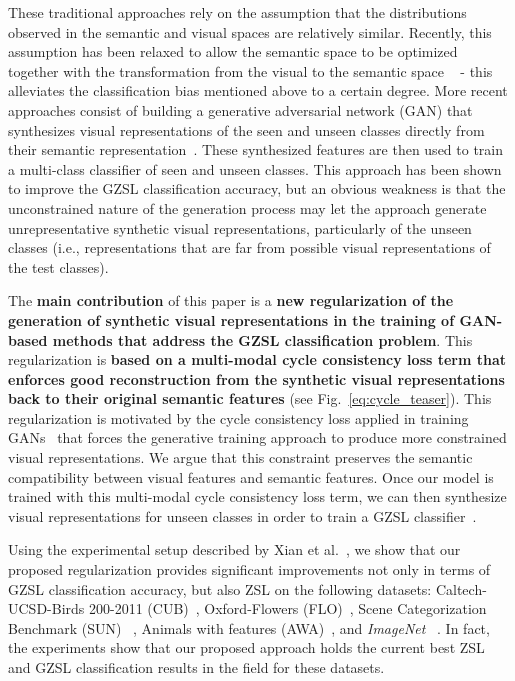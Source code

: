 \documentclass[runningheads]{llncs}
\begin{document}
These traditional approaches rely on the assumption that the distributions observed in the semantic and visual spaces are relatively similar.  Recently, this assumption has been relaxed to allow the semantic space to be optimized together with the transformation from the visual to the semantic space ~\cite{long2017zero} - this alleviates the classification bias mentioned above to a certain degree.  More recent approaches consist of building a generative adversarial network (GAN) that synthesizes visual representations of the seen and unseen classes directly from their semantic representation~\cite{bucher2017generating,long2017zero}.  These synthesized features are then used to train a multi-class classifier of seen and unseen classes.  This approach has been shown to improve the GZSL classification accuracy, but an obvious weakness is that the unconstrained nature of the generation process may let the approach generate unrepresentative synthetic visual representations, particularly of the unseen classes (i.e., representations that are far from possible visual representations of the test classes).

The {\bf main contribution} of this paper is a {\bf new regularization of the generation of synthetic visual representations in the training of GAN-based methods that address the GZSL classification problem}.  This regularization is \textbf{based on a multi-modal cycle consistency loss term that enforces good reconstruction from the synthetic visual representations back to their original semantic features}
(see Fig.~\ref{eq:cycle_teaser}). This regularization is motivated by the cycle consistency loss applied in training GANs~\cite{CycleGAN2017} that forces the generative training approach to produce more constrained visual representations. We argue that this constraint preserves the semantic compatibility between visual features and semantic features.
Once our model is trained with this multi-modal cycle consistency loss term, we can then synthesize visual representations for unseen classes in order to train a GZSL classifier~\cite{tran2017bayesian,XianCVPR2018}.

Using the experimental setup described by Xian et al.~\cite{XianCVPR2018}, we show that our proposed regularization provides significant improvements not only in terms of GZSL classification accuracy, but also  
ZSL on the following datasets: Caltech-UCSD-Birds 200-2011 (CUB)~\cite{welinder2010caltech,XianCVPR2017}, Oxford-Flowers (FLO)~\cite{nilsback2008automated}, Scene Categorization Benchmark (SUN) ~\cite{farhadi2009describing,XianCVPR2017}, Animals with features (AWA)~\cite{lampert2014attribute,XianCVPR2017}, and \textit{ImageNet}~\cite{deng2009imagenet} . In fact, the experiments show that our proposed approach holds the current best ZSL and GZSL classification results in the field for these datasets. 
\end{document}
